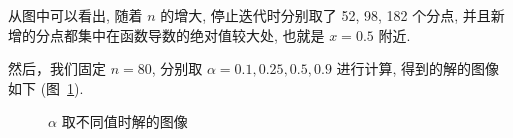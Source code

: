 \documentclass[UTF8]{article}
\begin{document}
    从图中可以看出, 随着 $n$ 的增大, 停止迭代时分别取了 52, 98, 182 个分点, 并且新增的分点都集中在函数导数的绝对值较大处, 也就是 $x=0.5$ 附近.
    \newline

    然后，我们固定 $n=80$, 分别取 $\alpha=0.1,0.25,0.5,0.9$ 进行计算, 得到的解的图像如下 (图~\ref{fig:figure4}).

    \begin{figure}[h]
        \centering
        \caption{$\alpha$ 取不同值时解的图像}
        \label{fig:figure4}
    \end{figure}
\end{document}
